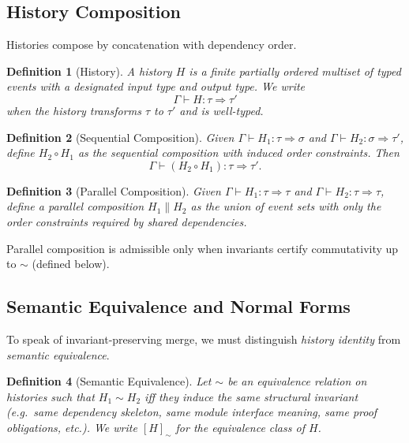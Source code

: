 \documentclass[11pt]{article}
\newtheorem{definition}{Definition}
\begin{document}
\subsection{History Composition}

Histories compose by concatenation with dependency order.

\begin{definition}[History]
A history $H$ is a finite partially ordered multiset of typed events with a designated input type and output type. We write
\[
\Gamma \vdash H : \tau \Rightarrow \tau'
\]
when the history transforms $\tau$ to $\tau'$ and is well-typed.
\end{definition}

\begin{definition}[Sequential Composition]
Given $\Gamma \vdash H_1 : \tau \Rightarrow \sigma$ and $\Gamma \vdash H_2 : \sigma \Rightarrow \tau'$, define $H_2 \circ H_1$ as the sequential composition with induced order constraints. Then
\[
\Gamma \vdash (H_2 \circ H_1) : \tau \Rightarrow \tau'.
\]
\end{definition}

\begin{definition}[Parallel Composition]
Given $\Gamma \vdash H_1 : \tau \Rightarrow \tau$ and $\Gamma \vdash H_2 : \tau \Rightarrow \tau$, define a parallel composition $H_1 \parallel H_2$ as the union of event sets with only the order constraints required by shared dependencies.
\end{definition}

Parallel composition is admissible only when invariants certify commutativity up to $\sim$ (defined below).

\subsection{Semantic Equivalence and Normal Forms}

To speak of invariant-preserving merge, we must distinguish \emph{history identity} from \emph{semantic equivalence}.

\begin{definition}[Semantic Equivalence]
Let $\sim$ be an equivalence relation on histories such that $H_1 \sim H_2$ iff they induce the same structural invariant (e.g.\ same dependency skeleton, same module interface meaning, same proof obligations, etc.). We write $[H]_{\sim}$ for the equivalence class of $H$.
\end{definition}
\end{document}
